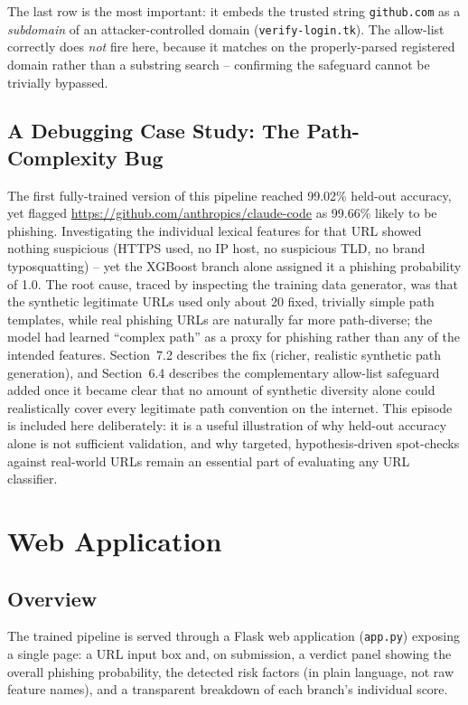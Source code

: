 \documentclass[11pt,a4paper]{report}
\begin{document}
The last row is the most important: it embeds the trusted string
\texttt{github.com} as a \emph{subdomain} of an attacker-controlled domain
(\texttt{verify-login.tk}). The allow-list correctly does \emph{not} fire here,
because it matches on the properly-parsed registered domain rather than a substring
search -- confirming the safeguard cannot be trivially bypassed.

\section{A Debugging Case Study: The Path-Complexity Bug}
The first fully-trained version of this pipeline reached 99.02\% held-out accuracy,
yet flagged \url{https://github.com/anthropics/claude-code} as 99.66\% likely to
be phishing. Investigating the individual lexical features for that URL showed
nothing suspicious (HTTPS used, no IP host, no suspicious TLD, no brand
typosquatting) -- yet the XGBoost branch alone assigned it a phishing probability of
1.0. The root cause, traced by inspecting the training data generator, was that the
synthetic legitimate URLs used only about 20 fixed, trivially simple path templates,
while real phishing URLs are naturally far more path-diverse; the model had learned
``complex path'' as a proxy for phishing rather than any of the intended features.
Section~7.2 describes the fix (richer, realistic synthetic path generation), and
Section~6.4 describes the complementary allow-list safeguard added once it became
clear that no amount of synthetic diversity alone could realistically cover every
legitimate path convention on the internet. This episode is included here
deliberately: it is a useful illustration of why held-out accuracy alone is not
sufficient validation, and why targeted, hypothesis-driven spot-checks against
real-world URLs remain an essential part of evaluating any URL classifier.

\chapter{Web Application}

\section{Overview}
The trained pipeline is served through a Flask web application
(\texttt{app.py}) exposing a single page: a URL input box and, on submission, a
verdict panel showing the overall phishing probability, the detected risk factors
(in plain language, not raw feature names), and a transparent breakdown of each
branch's individual score.
\end{document}
